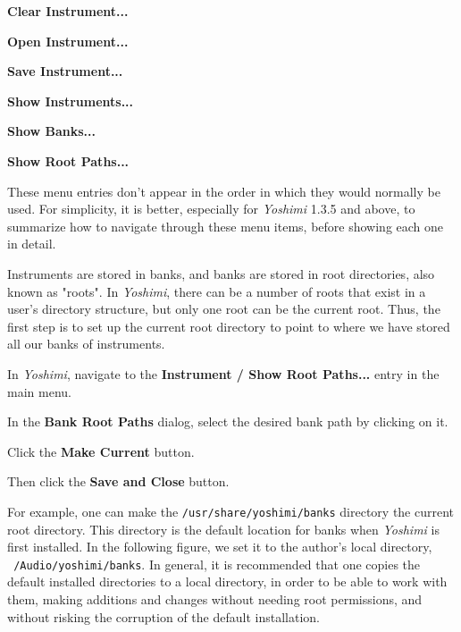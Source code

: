    \begin{enumber}
      \item \textbf{Clear Instrument...}
      \item \textbf{Open Instrument...}
      \item \textbf{Save Instrument...}
      \item \textbf{Show Instruments...}
      \item \textbf{Show Banks...}
      \item \textbf{Show Root Paths...}
   \end{enumber}

   These menu entries don't appear in the order in which they would normally
   be used.  For simplicity, it is better, especially for \textsl{Yoshimi}
   1.3.5 and above, to summarize how to navigate through these menu items,
   before showing each one in detail.

   \setcounter{ItemCounter}{0}      %

   Instruments are stored in banks, and banks are stored in root directories,
   also known as "roots".  In \textsl{Yoshimi}, there can be a number of
   roots that exist in a user's directory structure, but only one root can be
   the current root.  Thus, the first step is to set up the current root
   directory to point to where we have stored all our banks of instruments.

   \begin{enumber}
      \item In \textsl{Yoshimi}, navigate to the \textbf{Instrument / Show
      Root Paths...} entry in the main menu.
      \item In the \textbf{Bank Root Paths} dialog, select the desired
      bank path by clicking on it.
      \item Click the \textbf{Make Current} button.
      \item Then click the \textbf{Save and Close} button.
   \end{enumber}

   For example, one can make the \texttt{/usr/share/yoshimi/banks} directory
   the current root directory.  This directory is the default location for
   banks when \textsl{Yoshimi} is first installed.
   In the following figure, we set it to the author's local directory,
   \texttt{~/Audio/yoshimi/banks}.
   In general, it is recommended that one copies the default installed
   directories to a local directory, in order to be able to work with them,
   making additions and changes without needing root permissions, and
   without risking the corruption of the default installation.


